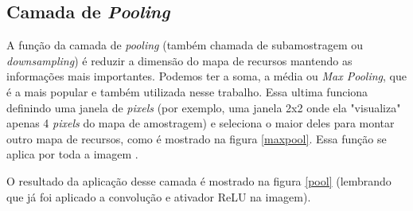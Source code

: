 \subsection{Camada de \textit{Pooling}}

A função da camada de \textit{pooling} (também chamada de subamostragem ou \textit{downsampling}) é reduzir a dimensão do mapa de recursos mantendo as informações mais importantes. Podemos ter a soma, a média ou \textit{Max Pooling}, que é a mais popular e também utilizada nesse trabalho. Essa ultima funciona definindo uma janela de \textit{pixels} (por exemplo, uma janela 2x2 onde ela "visualiza" apenas 4 \textit{pixels} do mapa de amostragem) e seleciona o maior deles para montar outro mapa de recursos, como é mostrado na figura \ref{maxpool}. Essa função se aplica por toda a imagem \cite{freecodecamp}.

\begin{figure}[H]
	\centering
\end{figure}

O resultado da aplicação desse camada é mostrado na figura \ref{pool} (lembrando que já foi aplicado a convolução e ativador ReLU na imagem).

\begin{figure}[H]
	\centering
\end{figure}

